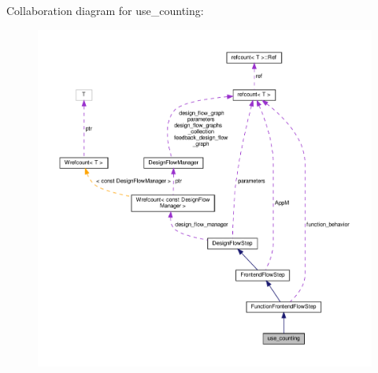 Collaboration diagram for use\+\_\+counting\+:
\nopagebreak
\begin{figure}[H]
\begin{center}
\leavevmode
\includegraphics[width=350pt]{d2/dfd/classuse__counting__coll__graph}
\end{center}
\end{figure}

